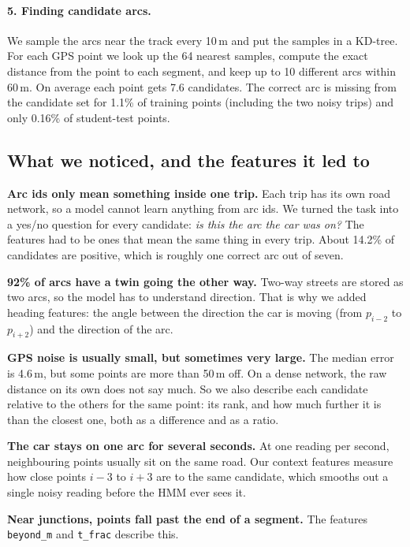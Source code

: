 \documentclass[11pt,a4paper]{article}
\newcommand{\code}[1]{\texttt{\small #1}}
\begin{document}
\paragraph{5. Finding candidate arcs.}
We sample the arcs near the track every 10\,m and put the samples in a KD-tree. For each GPS point we look
up the 64 nearest samples, compute the exact distance from the point to each segment, and keep up to 10
different arcs within 60\,m. On average each point gets 7.6 candidates. The correct arc is missing from the
candidate set for 1.1\% of training points (including the two noisy trips) and only 0.16\% of student-test
points.

\subsection{What we noticed, and the features it led to}

\textbf{Arc ids only mean something inside one trip.} Each trip has its own road network, so a model cannot
learn anything from arc ids. We turned the task into a yes/no question for every candidate: \emph{is this the
arc the car was on?} The features had to be ones that mean the same thing in every trip. About 14.2\% of
candidates are positive, which is roughly one correct arc out of seven.

\textbf{92\% of arcs have a twin going the other way.} Two-way streets are stored as two arcs, so the model
has to understand direction. That is why we added heading features: the angle between the direction the car
is moving (from $p_{i-2}$ to $p_{i+2}$) and the direction of the arc.

\textbf{GPS noise is usually small, but sometimes very large.} The median error is 4.6\,m, but some points
are more than 50\,m off. On a dense network, the raw distance on its own does not say much. So we also
describe each candidate relative to the others for the same point: its rank, and how much further it is than
the closest one, both as a difference and as a ratio.

\textbf{The car stays on one arc for several seconds.} At one reading per second, neighbouring points
usually sit on the same road. Our context features measure how close points $i-3$ to $i+3$ are to the same
candidate, which smooths out a single noisy reading before the HMM ever sees it.

\textbf{Near junctions, points fall past the end of a segment.} The features \code{beyond\_m} and
\code{t\_frac} describe this.
\end{document}
